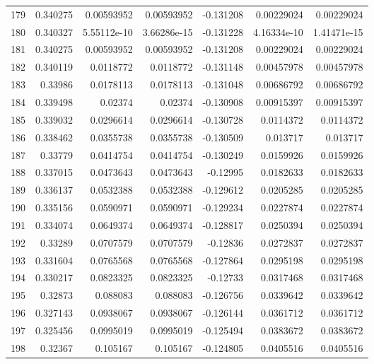 \begin{tabular}{rrrrrrr}
 179 &  0.340275    & 0.00593952  & 0.00593952  & -0.131208    & 0.00229024  & 0.00229024  \\
 180 &  0.340327    & 5.55112e-10 & 3.66286e-15 & -0.131228    & 4.16334e-10 & 1.41471e-15 \\
 181 &  0.340275    & 0.00593952  & 0.00593952  & -0.131208    & 0.00229024  & 0.00229024  \\
 182 &  0.340119    & 0.0118772   & 0.0118772   & -0.131148    & 0.00457978  & 0.00457978  \\
 183 &  0.33986     & 0.0178113   & 0.0178113   & -0.131048    & 0.00686792  & 0.00686792  \\
 184 &  0.339498    & 0.02374     & 0.02374     & -0.130908    & 0.00915397  & 0.00915397  \\
 185 &  0.339032    & 0.0296614   & 0.0296614   & -0.130728    & 0.0114372   & 0.0114372   \\
 186 &  0.338462    & 0.0355738   & 0.0355738   & -0.130509    & 0.013717    & 0.013717    \\
 187 &  0.33779     & 0.0414754   & 0.0414754   & -0.130249    & 0.0159926   & 0.0159926   \\
 188 &  0.337015    & 0.0473643   & 0.0473643   & -0.12995     & 0.0182633   & 0.0182633   \\
 189 &  0.336137    & 0.0532388   & 0.0532388   & -0.129612    & 0.0205285   & 0.0205285   \\
 190 &  0.335156    & 0.0590971   & 0.0590971   & -0.129234    & 0.0227874   & 0.0227874   \\
 191 &  0.334074    & 0.0649374   & 0.0649374   & -0.128817    & 0.0250394   & 0.0250394   \\
 192 &  0.33289     & 0.0707579   & 0.0707579   & -0.12836     & 0.0272837   & 0.0272837   \\
 193 &  0.331604    & 0.0765568   & 0.0765568   & -0.127864    & 0.0295198   & 0.0295198   \\
 194 &  0.330217    & 0.0823325   & 0.0823325   & -0.12733     & 0.0317468   & 0.0317468   \\
 195 &  0.32873     & 0.088083    & 0.088083    & -0.126756    & 0.0339642   & 0.0339642   \\
 196 &  0.327143    & 0.0938067   & 0.0938067   & -0.126144    & 0.0361712   & 0.0361712   \\
 197 &  0.325456    & 0.0995019   & 0.0995019   & -0.125494    & 0.0383672   & 0.0383672   \\
 198 &  0.32367     & 0.105167    & 0.105167    & -0.124805    & 0.0405516   & 0.0405516   \\

\end{tabular}

